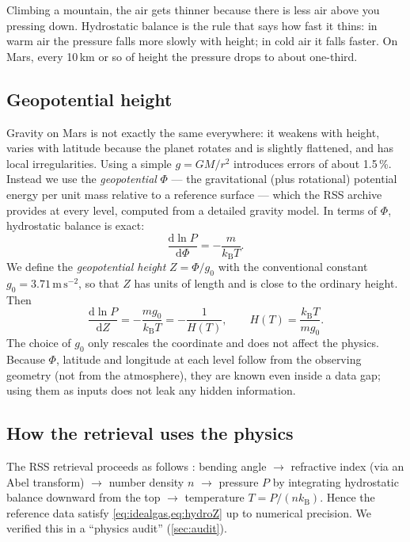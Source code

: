 \documentclass[11pt,a4paper]{article}
\newcommand{\dd}{\mathrm{d}}
\newcommand{\kB}{k_{\mathrm{B}}}
\begin{document}
\begin{plainbox}
Climbing a mountain, the air gets thinner because there is less air above you pressing down. Hydrostatic balance is the rule that says how fast it thins: in warm air the pressure falls more slowly with height; in cold air it falls faster. On Mars, every 10\,km or so of height the pressure drops to about one-third.
\end{plainbox}

\subsection{Geopotential height}\label{sec:geopot}
Gravity on Mars is not exactly the same everywhere: it weakens with height, varies with latitude because the planet rotates and is slightly flattened, and has local irregularities. Using a simple $g=GM/r^2$ introduces errors of about 1.5\,\%. Instead we use the \emph{geopotential} $\Phi$ --- the gravitational (plus rotational) potential energy per unit mass relative to a reference surface --- which the RSS archive provides at every level, computed from a detailed gravity model. In terms of $\Phi$, hydrostatic balance is exact:
\begin{equation}
\frac{\dd\ln P}{\dd\Phi} = -\frac{m}{\kB T}.
\end{equation}
We define the \emph{geopotential height} $Z=\Phi/g_0$ with the conventional constant $g_0=3.71\,\mathrm{m\,s^{-2}}$, so that $Z$ has units of length and is close to the ordinary height. Then
\begin{equation}
\frac{\dd\ln P}{\dd Z} = -\frac{m g_0}{\kB T} = -\frac{1}{H(T)},\qquad H(T)=\frac{\kB T}{m g_0}. \label{eq:hydroZ}
\end{equation}
The choice of $g_0$ only rescales the coordinate and does not affect the physics. Because $\Phi$, latitude and longitude at each level follow from the observing geometry (not from the atmosphere), they are known even inside a data gap; using them as inputs does not leak any hidden information.

\subsection{How the retrieval uses the physics}\label{sec:retrieval}
The RSS retrieval proceeds as follows \citep{hinson1999}: bending angle $\rightarrow$ refractive index (via an Abel transform) $\rightarrow$ number density $n$ $\rightarrow$ pressure $P$ by integrating hydrostatic balance downward from the top $\rightarrow$ temperature $T=P/(n\kB)$. Hence the reference data satisfy \cref{eq:idealgas,eq:hydroZ} up to numerical precision. We verified this in a ``physics audit'' (\cref{sec:audit}).
\end{document}
